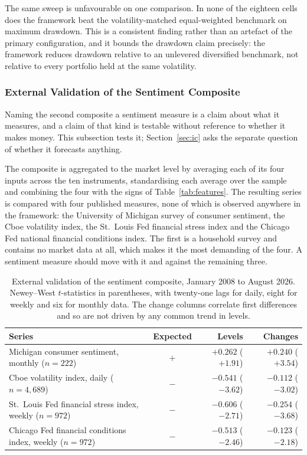 The same sweep is unfavourable on one comparison. In none of the eighteen cells does the
framework beat the volatility-matched equal-weighted benchmark on maximum drawdown. This
is a consistent finding rather than an artefact of the primary configuration, and it
bounds the drawdown claim precisely: the framework reduces drawdown relative to an
unlevered diversified benchmark, not relative to every portfolio held at the same
volatility.

\subsubsection{External Validation of the Sentiment Composite}
\label{sec:sentval}

Naming the second composite a sentiment measure is a claim about what it measures, and a
claim of that kind is testable without reference to whether it makes money. This
subsection tests it; Section~\ref{sec:ic} asks the separate question of whether it
forecasts anything.

The composite is aggregated to the market level by averaging each of its four inputs
across the ten instruments, standardising each average over the sample and combining the
four with the signs of Table~\ref{tab:features}. The resulting series is compared with
four published measures, none of which is observed anywhere in the framework: the
University of Michigan survey of consumer sentiment, the Cboe volatility index, the
St.~Louis Fed financial stress index and the Chicago Fed national financial conditions
index. The first is a household survey and contains no market data at all, which makes it
the most demanding of the four. A sentiment measure should move with it and against the
remaining three.

\begin{table}[!ht]
\centering
\caption{External validation of the sentiment composite, January 2008 to August 2026.
Newey--West $t$-statistics in parentheses, with twenty-one lags for daily, eight for
weekly and six for monthly data. The change columns correlate first differences and so
are not driven by any common trend in levels.}
\label{tab:sentval}
\footnotesize
\begin{tabular}{p{4.5cm}crr}
\hline
\textbf{Series} & \textbf{Expected} & \textbf{Levels} & \textbf{Changes} \\
\hline
Michigan consumer sentiment, monthly ($n=222$) & $+$ & $+0.262$ ($+1.91$) & $+0.240$ ($+3.54$) \\
\hline
Cboe volatility index, daily ($n=4{,}689$) & $-$ & $-0.541$ ($-3.62$) & $-0.112$ ($-3.02$) \\
\hline
St.~Louis Fed financial stress index, weekly ($n=972$) & $-$ & $-0.606$ ($-2.71$) & $-0.254$ ($-3.68$) \\
\hline
Chicago Fed financial conditions index, weekly ($n=972$) & $-$ & $-0.513$ ($-2.46$) & $-0.123$ ($-2.18$) \\
\hline
\end{tabular}
\end{table}

